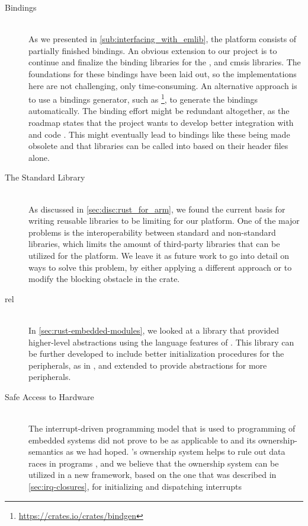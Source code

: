 \begin{description}
\item[Bindings] \hfill \\
  As we presented in \autoref{sub:interfacing_with_emlib}, the {\rg} platform consists of partially finished bindings.
  An obvious extension to our project is to continue and finalize the binding libraries for the {\emlib}, {\emdrv} and \gls{cmsis} libraries.
  The foundations for these bindings have been laid out, so the implementations here are not challenging, only time-consuming.
  An alternative approach is to use a bindings generator, such as \footnote{\url{https://crates.io/crates/bindgen}}, to generate the bindings automatically.
  The binding effort might be redundant altogether, as the {\rust} roadmap states that the project wants to develop better integration with {\C} and {\Cpp} code \cite{web:roadmap}.
  This might eventually lead to bindings like these being made obsolete and that {\C} libraries can be called into based on their header files alone.

\item[The Standard Library] \hfill \\
  As discussed in \autoref{sec:disc:rust_for_arm}, we found the current basis for writing reusable libraries to be limiting for our platform.
  One of the major problems is the interoperability between standard and non-standard libraries, which limits the amount of third-party libraries that can be utilized for the {\rg} platform.
  We leave it as future work to go into detail on ways to solve this problem, by either applying a different approach or to modify the blocking obstacle in the  crate.

\item[\glsdesc{rel}] \hfill \\
  In \autoref{sec:rust-embedded-modules}, we looked at a library that provided higher-level abstractions using the language features of {\rust}.
  This library can be further developed to include better initialization procedures for the peripherals, as in {\zinc}, and extended to provide abstractions for more peripherals.

\item[Safe Access to Hardware] \hfill \\
  The interrupt-driven programming model that is used to programming of embedded systems did not prove to be as applicable to {\rust} and its ownership-semantics as we had hoped.
  {\rust}'s ownership system helps to rule out data races in programs \cite{web:rust_book}, and
  we believe that the ownership system can be utilized in a new framework, based on the one that was described in \autoref{sec:irq-closures}, for initializing and dispatching interrupts


\end{description}
